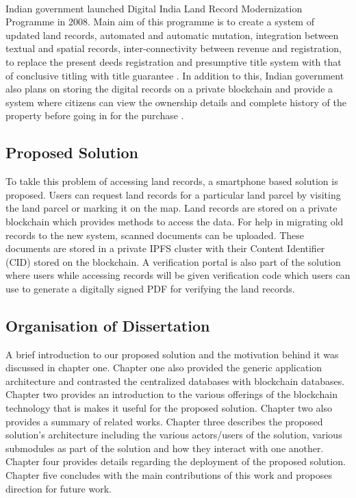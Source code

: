 \documentclass{article}
\begin{document}
        \paragraph{}
        Indian government launched Digital India Land Record Modernization Programme in 2008. Main aim of this programme is to create a system of updated land records, automated and automatic mutation, integration between textual and spatial records, inter-connectivity between revenue and registration, to replace the present deeds registration and presumptive title system with that of conclusive titling with title guarantee \cite{dilrmp}. In addition to this, Indian government also plans on storing the digital records on a private blockchain and provide a system where citizens can view the ownership details and complete history of the property before going in for the purchase \cite{blockchaingovin}.  

    \subsection{Proposed Solution}
        To takle this problem of accessing land records, a smartphone based solution is proposed. Users can request land records for a particular land parcel by visiting the land parcel or marking it on the map. Land records are stored on a private blockchain which provides methods to access the data. For help in migrating old records to the new system, scanned documents can be uploaded. These documents are stored in a private IPFS cluster with their Content Identifier (CID) stored on the blockchain. A verification portal is also part of the solution where users while accessing records will be given verification code which users can use to generate a digitally signed PDF for verifying the land records. 
        
    \subsection{Organisation of Dissertation}
        A brief introduction to our proposed solution and the motivation behind it was discussed in chapter one. Chapter one also provided the generic application architecture and contrasted the centralized databases with blockchain databases. Chapter two provides an introduction to the various offerings of the blockchain technology that is makes it useful for the proposed solution. Chapter two also provides a summary of related works. Chapter three describes the proposed solution's architecture including the various actors/users of the solution, various submodules as part of the solution and how they interact with one another. Chapter four provides details regarding the deployment of the proposed solution. Chapter five concludes with the main contributions of this work and proposes direction for future work.
        
\end{document}
